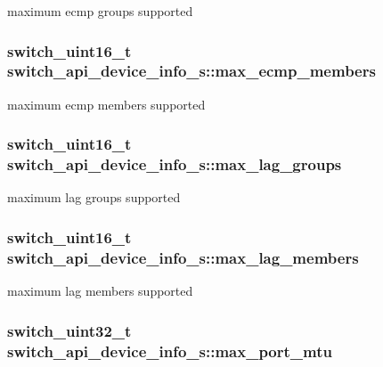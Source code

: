 maximum ecmp groups supported \hypertarget{structswitch__api__device__info__s_ae5b7248aae9aa7931b8122c48126e608}{
\subsubsection[{max\+\_\+ecmp\+\_\+members}]{\setlength{\rightskip}{0pt plus 5cm}switch\+\_\+uint16\+\_\+t switch\+\_\+api\+\_\+device\+\_\+info\+\_\+s\+::max\+\_\+ecmp\+\_\+members}}\label{structswitch__api__device__info__s_ae5b7248aae9aa7931b8122c48126e608}
maximum ecmp members supported \hypertarget{structswitch__api__device__info__s_ac4b4f3d5f6b50a9bdfe9942c4381bc47}{
\subsubsection[{max\+\_\+lag\+\_\+groups}]{\setlength{\rightskip}{0pt plus 5cm}switch\+\_\+uint16\+\_\+t switch\+\_\+api\+\_\+device\+\_\+info\+\_\+s\+::max\+\_\+lag\+\_\+groups}}\label{structswitch__api__device__info__s_ac4b4f3d5f6b50a9bdfe9942c4381bc47}
maximum lag groups supported \hypertarget{structswitch__api__device__info__s_a59c6a528e2e720386b439ae99376a8ea}{
\subsubsection[{max\+\_\+lag\+\_\+members}]{\setlength{\rightskip}{0pt plus 5cm}switch\+\_\+uint16\+\_\+t switch\+\_\+api\+\_\+device\+\_\+info\+\_\+s\+::max\+\_\+lag\+\_\+members}}\label{structswitch__api__device__info__s_a59c6a528e2e720386b439ae99376a8ea}
maximum lag members supported \hypertarget{structswitch__api__device__info__s_a514fef0113d6c42d6cdef95e475fb395}{
\subsubsection[{max\+\_\+port\+\_\+mtu}]{\setlength{\rightskip}{0pt plus 5cm}switch\+\_\+uint32\+\_\+t switch\+\_\+api\+\_\+device\+\_\+info\+\_\+s\+::max\+\_\+port\+\_\+mtu}}\label{structswitch__api__device__info__s_a514fef0113d6c42d6cdef95e475fb395}
